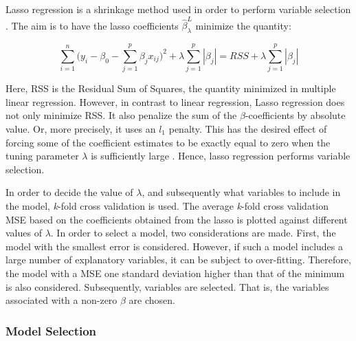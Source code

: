 Lasso regression is a shrinkage method used in order to perform variable selection \citep{ISLR}. The aim is to have the lasso coefficients $\hat{\beta}_{\lambda}^{L}$ minimize the quantity:

\begin{equation*}
    \sum_{i=1}^n\Big (y_i-\beta_0-\sum_{j=1}^p\beta_jx_{ij}\Big)^2 + \lambda \sum_{j=1}^p|\beta_j| = RSS + \lambda \sum_{j=1}^p|\beta_j|
\end{equation*}

Here, RSS is the Residual Sum of Squares, the quantity minimized in multiple linear regression. However, in contrast to linear regression, Lasso regression does not only minimize RSS. It also penalize the sum of the $\beta$-coefficients by absolute value. Or, more precisely, it uses an $l_1$ penalty. This has the desired effect of forcing some of the coefficient estimates to be exactly equal to zero when the tuning parameter $\lambda$ is sufficiently large \citep{ISLR}. Hence, lasso regression performs variable selection.\newpar 

In order to decide the value of $\lambda$, and subsequently what variables to include in the model, \textit{k}-fold cross validation is used. The average \textit{k}-fold cross validation MSE based on the coefficients obtained from the lasso is plotted against different values of $\lambda$. In order to select a model, two considerations are made. First, the model with the smallest error is considered. However, if such a model includes a large number of explanatory variables, it can be subject to over-fitting. Therefore, the model with a MSE one standard deviation higher than that of the minimum is also considered. Subsequently, variables are selected. That is, the variables associated with a non-zero $\beta$ are chosen. 

\subsubsection{Model Selection}

